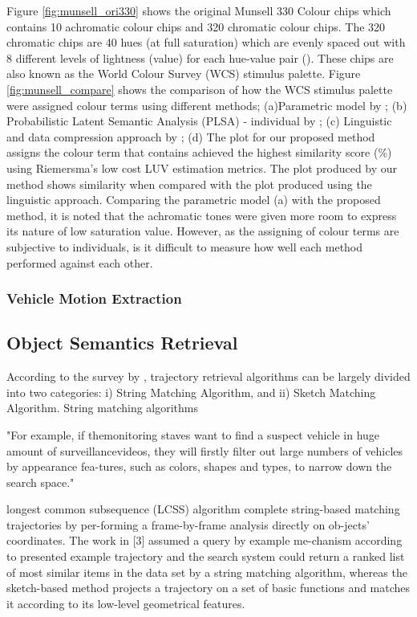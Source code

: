 Figure \ref{fig:munsell_ori330} shows the original Munsell 330 Colour chips which contains 10 achromatic colour chips and 320 chromatic colour chips. 
The 320 chromatic chips are 40 hues (at full saturation) which are evenly spaced out with 8 different levels of lightness (value) for each hue-value pair (\cite{kay2009world}).
These chips are also known as the World Colour Survey (WCS) stimulus palette.  
Figure \ref{fig:munsell_compare} shows the comparison of how the WCS stimulus palette were assigned colour terms using different methods; (a)Parametric model by ; (b)  Probabilistic Latent Semantic Analysis (PLSA) - individual by ; (c) Linguistic and data compression approach by ; (d) The plot for our proposed method assigns the colour term that contains achieved the highest similarity score (\%) using Riemersma's low cost LUV estimation metrics.
The plot produced by our method shows similarity when compared with the plot produced using the linguistic approach. Comparing the parametric model (a) with the proposed method, it is noted that the achromatic tones were given more room to express its nature of low saturation value. However, as the assigning of colour terms are subjective to individuals, is it difficult to measure how well each method performed against each other. 


\subsubsection{Vehicle Motion Extraction}


\subsection{Object Semantics Retrieval}

According to the survey by \cite{chandran2017review}, trajectory retrieval algorithms can be largely divided into two categories: i) String  Matching Algorithm, and ii) Sketch Matching Algorithm. String matching algorithms   




"For example, if themonitoring staves want to find a suspect vehicle in huge amount of surveillancevideos, they will firstly filter out large numbers of vehicles by appearance fea-tures, such as colors, shapes and types, to narrow down the search space."


longest   common   subsequence   (LCSS)   algorithm complete  string-based  matching  trajectories  by  per-forming  a  frame-by-frame  analysis  directly  on  ob-jects’ coordinates. The  work  in  [3]  assumed a  query  by  example  me-chanism  according  to  presented  example  trajectory and  the  search  system  could  return  a  ranked  list  of most similar items in the data set by a string matching algorithm,  whereas  the  sketch-based  method  projects a trajectory on a  set of basic functions and matches it according to its low-level geometrical features.